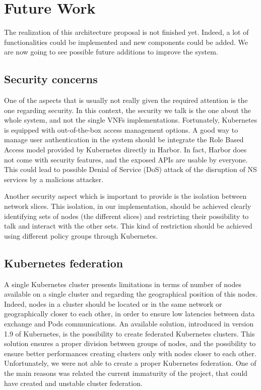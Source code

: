 \chapter{Future Work}
\label{chap:fw}

The realization of this architecture proposal is not finished yet. Indeed, a lot
of functionalities could be implemented and new components could be added. We
are now going to see possible future additions to improve the system.

\section{Security concerns}

One of the aspects that is usually not really given the required attention is
the one regarding security. In this context, the security we talk is the one
about the whole system, and not the single VNFs implementations. Fortunately,
Kubernetes is equipped with out-of-the-box access management options. A good way
to manage user authentication in the system should be integrate the Role Based
Access model provided by Kubernetes directly in Harbor. In fact, Harbor does not
come with security features, and the exposed APIs are usable by everyone. This
could lead to possible Denial of Service (DoS) attack of the disruption of NS
services by a malicious attacker.

Another security aspect which is important to provide is the isolation between
network slices. This isolation, in our implementation, should be achieved
clearly identifying sets of nodes (the different slices) and restricting their
possibility to talk and interact with the other sets. This kind of restriction
should be achieved using different policy groups through Kubernetes.

\section{Kubernetes federation}

A single Kubernetes cluster presents limitations in terms of number of nodes
available on a single cluster and regarding the geographical position of this
nodes. Indeed, nodes in a cluster should be located or in the same network or
geographically closer to each other, in order to ensure low latencies between
data exchange and Pods communications. An available solution, introduced in
version 1.9 of Kubernetes, is the possibility to create federated Kubernetes
clusters. This solution ensures a proper division between groups of nodes, and
the possibility to ensure better performances creating clusters only with nodes
closer to each other. Unfortunately, we were not able to create a proper
Kubernetes federation. One of the main reasons was related the current
immaturity of the project, that could have created and unstable cluster
federation.

